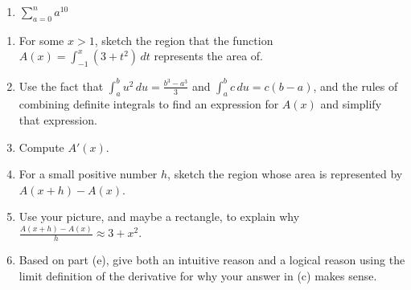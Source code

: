 \begin{enumerate}

\item $\sum_{a = 0}^n a^10$

\end{enumerate}

\begin{enumerate}

\item  For some $x > 1$, sketch the region that the function $\displaystyle{A(x) = \int_{-1}^x (3 + t^2)\,dt}$ represents the area of.

\item  Use the fact that $\displaystyle{\int_a^b u^2\,du = \frac{b^3-a^3}{3}}$ and $\displaystyle{\int_a^bc\,du = c(b-a)}$, and the rules of combining definite integrals to find an expression for $A(x)$ and simplify that expression.

\smallskip

\item  Compute $A'(x)$.

\smallskip

\item  For a small positive number $h$, sketch the region whose area is represented by \\$A(x + h) - A(x)$.

\smallskip

\item  Use your picture, and maybe a rectangle, to explain why $\displaystyle{\frac{A(x+h) - A(x)}{h} \approx 3 + x^2}$.

\smallskip

\item  Based on part (e), give both an intuitive reason and a logical reason using the limit definition of the derivative for why your answer in (c) makes sense.

\smallskip

\end{enumerate}